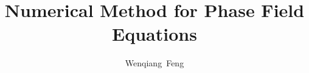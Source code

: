 \documentclass[cmbright]{mymmaauth}
\newtheorem{definition}{Definition}[section]
\begin{document}
 \allowdisplaybreaks
{}
\title{Numerical Method for Phase Field Equations}
\author{Wenqiang~Feng}



\maketitle\vspace{-6pt}
\end{document}
